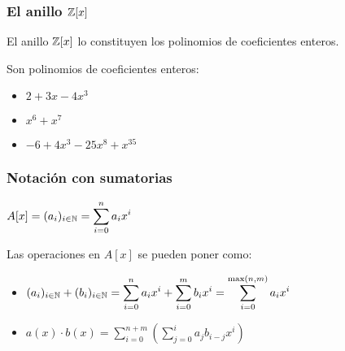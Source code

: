 \subsubsection{El anillo $\mathbb{Z}[x]$}
El anillo $\mathbb{Z}[x]$ lo constituyen los polinomios de coeficientes enteros.

\begin{example}
	Son polinomios de coeficientes enteros:
	\begin{itemize}
		\item $2 + 3x - 4x^3$
		\item $x^6 + x^7$
		\item $-6 + 4x^3 - 25x^8 + x^{35}$
	\end{itemize}
\end{example}

\subsubsection{Notación con sumatorias}

$ \displaystyle A[x] =  (a_i)_{i \in \mathbb{N}} = \sum_{i=0}^{n} a_i x^i$

Las operaciones en $A[x]$ se pueden poner como:
\begin{itemize}
	\item $ \displaystyle (a_i)_{i \in \mathbb{N}} + (b_i)_{i \in \mathbb{N}} = \sum_{i=0}^{n} a_i x^i  + \sum_{i=0}^{m} b_i x^i  = \sum_{i=0}^{\max(n,m)} a_i x^i $
	\item $ \displaystyle a(x) \cdot b(x) = \sum_{i=0}^{n + m} \left( \sum_{j=0}^{i} a_j b_{i-j} x^i \right)$
\end{itemize}

